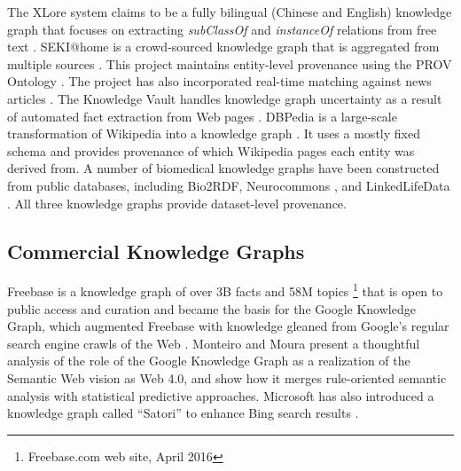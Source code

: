 The XLore system claims to be a fully bilingual (Chinese and English) knowledge graph that focuses on extracting \emph{subClassOf} and \emph{instanceOf} relations from free text \cite{wang2013xlore}.
SEKI@home is a crowd-sourced knowledge graph that is aggregated from multiple sources \cite{steiner2012seki}.
This project maintains entity-level provenance using the PROV Ontology \cite{Moreau_2015}.
The project has also incorporated real-time matching against news articles \cite{steiner_iswc_2012}.
The Knowledge Vault handles knowledge graph uncertainty as a result of automated fact extraction from Web pages \cite{Dong_2014}.
DBPedia is a large-scale transformation of Wikipedia into a knowledge graph \cite{Bizer_2009}.
It uses a mostly fixed schema and provides provenance of which Wikipedia pages each entity was derived from.
A number of biomedical knowledge graphs have been constructed from public databases, including Bio2RDF\cite{Callahan_2013}, Neurocommons \cite{Ruttenberg_2009}, and LinkedLifeData \cite{momtchev2009expanding}.
All three knowledge graphs provide dataset-level provenance.

\subsection{Commercial Knowledge Graphs}
Freebase is a knowledge graph of over 3B facts and 58M topics \footnote{Freebase.com web site, April 2016} that is open to public access and curation \cite{Bollacker_2008} and became the basis for the Google Knowledge Graph, which augmented Freebase with knowledge gleaned from Google's regular search engine crawls of the Web \cite{singhal2012introducing}.
Monteiro and Moura \cite{10110943220141101} present a thoughtful analysis of the role of the Google Knowledge Graph as a realization of the Semantic Web vision \cite{bernerslee2000semantic} as Web 4.0, and show how it merges rule-oriented semantic analysis with statistical predictive approaches.
Microsoft has also introduced a knowledge graph called ``Satori'' to enhance Bing search results \cite{qian2013understand}.
